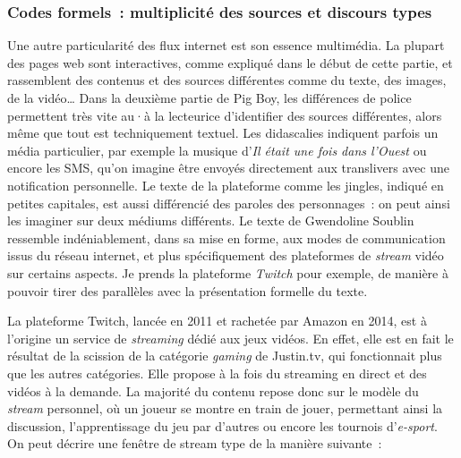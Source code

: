 \documentclass[
]{article}
\begin{document}
\subsubsection{Codes formels~: multiplicité des sources et discours types}\label{codes-formels-multiplicituxe9-des-sources-et-discours-types}

Une autre particularité des flux internet est son essence multimédia. La plupart des pages web sont interactives, comme expliqué dans le début de cette partie, et rassemblent des contenus et des sources différentes comme du texte, des images, de la vidéo\ldots{} Dans la deuxième partie de Pig Boy, les différences de police permettent très vite au·à la lecteurice d'identifier des sources différentes, alors même que tout est techniquement textuel. Les didascalies indiquent parfois un média particulier, par exemple la musique d'\emph{Il était une fois dans l'Ouest} ou encore les SMS, qu'on imagine être envoyés directement aux translivers avec une notification personnelle. Le texte de la plateforme comme les jingles, indiqué en petites capitales, est aussi différencié des paroles des personnages~: on peut ainsi les imaginer sur deux médiums différents. Le texte de Gwendoline Soublin ressemble indéniablement, dans sa mise en forme, aux modes de communication issus du réseau internet, et plus spécifiquement des plateformes de \emph{stream} vidéo sur certains aspects. Je prends la plateforme \emph{Twitch }pour exemple, de manière à pouvoir tirer des parallèles avec la présentation formelle du texte.

La plateforme Twitch, lancée en 2011 et rachetée par Amazon en 2014, est à l'origine un service de \emph{streaming} dédié aux jeux vidéos. En effet, elle est en fait le résultat de la scission de la catégorie \emph{gaming} de Justin.tv, qui fonctionnait plus que les autres catégories. Elle propose à la fois du streaming en direct et des vidéos à la demande. La majorité du contenu repose donc sur le modèle du \emph{stream }personnel, où un joueur se montre en train de jouer, permettant ainsi la discussion, l'apprentissage du jeu par d'autres ou encore les tournois d'\emph{e-sport}. On peut décrire une fenêtre de stream type de la manière suivante~:
\end{document}
